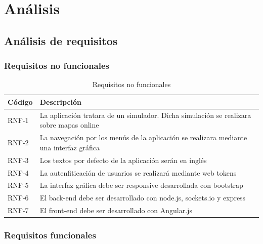 \chapter{Análisis}

\section{Análisis de requisitos}

\subsection{Requisitos no funcionales}

\begin{table}[H]
	\begin{center}
		\begin{tabular}{|p{1.5cm}| p{10.5cm}|}
			\hline
			Código & Descripción \\
			\hline
			RNF-1  & La aplicación tratara de un simulador. Dicha simulación se realizara sobre mapas online\\ \hline
			RNF-2  & La navegación por los menús de la aplicación se realizara mediante una interfaz gráfica\\ \hline
			RNF-3  & Los textos por defecto de la aplicación serán en inglés\\ \hline
			RNF-4  & La autenfiticación de usuarios se realizará mediante web tokens\\ \hline
			RNF-5  & La interfaz gráfica debe ser responsive desarrollada con bootstrap\\ \hline
			RNF-6  & El back-end debe ser desarrollado con node.js, sockets.io y express \\ \hline
			RNF-7  & El front-end debe ser desarrollado con Angular.js\\ \hline
		\end{tabular}
		\caption{Requisitos no funcionales}
		\label{tabla:requisitosNoFuncionales2}
	\end{center}
\end{table}

\newpage

\subsection{Requisitos funcionales}


